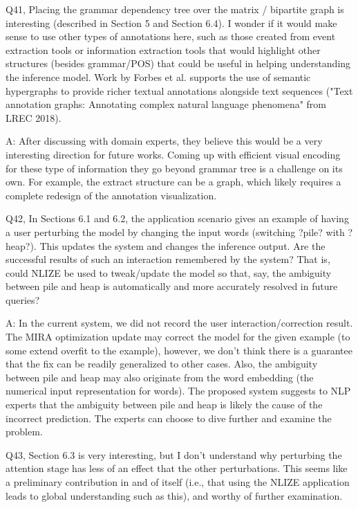 Q41, Placing the grammar dependency tree over the matrix / bipartite graph is interesting (described in Section 5 and Section 6.4). I wonder if it would make sense to use other types of annotations here, such as those created from event extraction tools or information extraction tools that would highlight other structures (besides grammar/POS) that could be useful in helping understanding the inference model. Work by Forbes et al. supports the use of semantic hypergraphs to provide richer textual annotations alongside text sequences ("Text annotation graphs: Annotating complex natural language phenomena" from LREC 2018).

A: After discussing with domain experts, they believe this would be a very interesting direction for future works. Coming up with efficient visual encoding for these type of information they go beyond grammar tree is a challenge on its own. For example, the extract structure can be a graph, which likely requires a complete redesign of the annotation visualization.

Q42, In Sections 6.1 and 6.2, the application scenario gives an example of having a user perturbing the model by changing the input words (switching ?pile? with ?heap?). This updates the system and changes the inference output. Are the successful results of such an interaction remembered by the system? That is, could NLIZE be used to tweak/update the model so that, say, the ambiguity between pile and heap is automatically and more accurately resolved in future queries?

A: In the current system, we did not record the user interaction/correction result. The MIRA optimization update may correct the model for the given example (to some extend overfit to the example), however, we don't think there is a guarantee that the fix can be readily generalized to other cases. Also, the ambiguity between pile and heap may also originate from the word embedding (the numerical input representation for words). The proposed system suggests to NLP experts that the ambiguity between pile and heap is likely the cause of the incorrect prediction. The experts can choose to dive further and examine the problem.

Q43, Section 6.3 is very interesting, but I don't understand why perturbing the attention stage has less of an effect that the other perturbations. This seems like a preliminary contribution in and of itself (i.e., that using the NLIZE application leads to global understanding such as this), and worthy of further examination.

